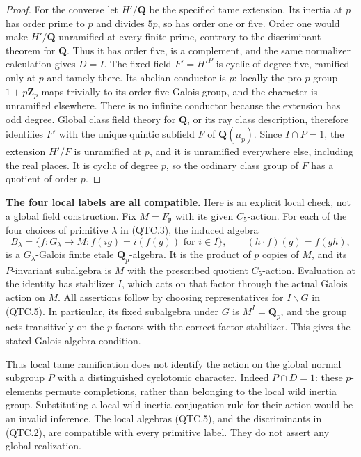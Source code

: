 \documentclass[11pt,a4paper]{article}
\theoremstyle{definition}
\renewcommand{\paragraph}[1]{\par\smallskip\noindent\textbf{#1}\quad\ignorespaces}
\begin{document}
\begin{proof}
For the converse let $H'/\mathbf Q$ be the specified tame extension.
Its inertia at $p$ has order prime to $p$ and divides $5p$, so has
order one or five.  Order one would make $H'/\mathbf Q$ unramified
at every finite prime, contrary to the discriminant theorem for
$\mathbf Q$.  Thus it has order five, is a complement, and the
same normalizer calculation gives $D=I$.
The fixed field $F'=H'^P$ is cyclic of degree five, ramified only
at $p$ and tamely there.  Its abelian conductor is $p$:
locally the pro-$p$ group $1+p\mathbf Z_p$ maps trivially to its
order-five Galois group, and the character is unramified elsewhere.
There is no infinite conductor because the extension has odd degree.
Global class field theory for $\mathbf Q$, or its ray class description,
therefore identifies $F'$ with the unique quintic subfield $F$ of
$\mathbf Q(\mu_p)$.  Since $I\cap P=1$, the extension $H'/F$
is unramified at $p$, and it is unramified everywhere else, including
the real places.  It is cyclic of degree $p$, so the ordinary class
group of $F$ has a quotient of order $p$.
\end{proof}

\paragraph{The four local labels are all compatible.}
Here is an explicit local check, not a global field construction.
Fix $M=F_{\mathfrak p}$ with its given $C_5$-action.  For each of the
four choices of primitive $\lambda$ in (QTC.3), the induced algebra
\[
 B_\lambda=
 \{f:G_\lambda\to M:f(ig)=i(f(g))\text{ for }i\in I\},
 \qquad (h\cdot f)(g)=f(gh),                          \tag{QTC.5}
\]
is a $G_\lambda$-Galois finite etale $\mathbf Q_p$-algebra.
It is the product of $p$ copies of $M$, and its $P$-invariant
subalgebra is $M$ with the prescribed quotient $C_5$-action.
Evaluation at the identity has stabilizer $I$, which acts on that
factor through the actual Galois action on $M$.
All assertions follow by choosing representatives for $I\backslash G$
in (QTC.5).  In particular, its fixed subalgebra under $G$ is
$M^I=\mathbf Q_p$, and the group acts transitively on the $p$ factors
with the correct factor stabilizer.  This gives the stated Galois
algebra condition.

Thus local tame ramification does not identify the action on the
global normal subgroup $P$ with a distinguished cyclotomic character.
Indeed $P\cap D=1$: these $p$-elements permute completions, rather
than belonging to the local wild inertia group.  Substituting a
local wild-inertia conjugation rule for their action would be an
invalid inference.  The local algebras (QTC.5), and the discriminants
in (QTC.2), are compatible with every primitive label.  They do not
assert any global realization.
\end{document}
